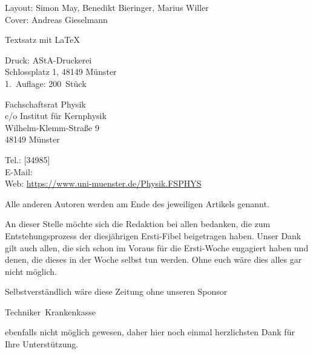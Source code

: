 \begin{multicols*}{2}
{	\footnotesize
	Layout: Simon May, Benedikt Bieringer, Marius Willer\\
	Cover: Andreas Gieselmann
	
	Textsatz mit \LaTeX
	
	Druck: AStA-Druckerei\\
	Schlossplatz 1, 48149 Münster\\
	1.~Auflage: 200~Stück

	\vspace{-1ex}
	\vspace{-1ex}
	Fachschaftsrat Physik\\
	c/o Institut für Kernphysik\\
	Wilhelm-Klemm-Straße 9\\
	48149 Münster
	
	Tel.: [34985]\\
	E-Mail: \\
	Web: \url{https://www.uni-muenster.de/Physik.FSPHYS}
\par}

\footnotesize
Alle anderen Autoren werden am Ende des jeweiligen
Artikels genannt.

An dieser Stelle möchte sich die Redaktion bei allen bedanken, die zum Entstehungsprozess der diesjährigen Ersti-Fibel beigetragen haben.
%
Unser Dank gilt auch allen, die sich schon im Voraus für die Ersti-Woche engagiert haben und denen, die dieses in der Woche selbst tun werden.
Ohne euch wäre dies alles gar nicht möglich.

Selbstverständlich wäre diese Zeitung ohne unseren Sponsor
\begin{center}
	Techniker~Krankenkasse
\end{center}
ebenfalls nicht möglich gewesen, daher hier noch einmal herzlichsten Dank für Ihre Unterstützung.
\end{multicols*}

